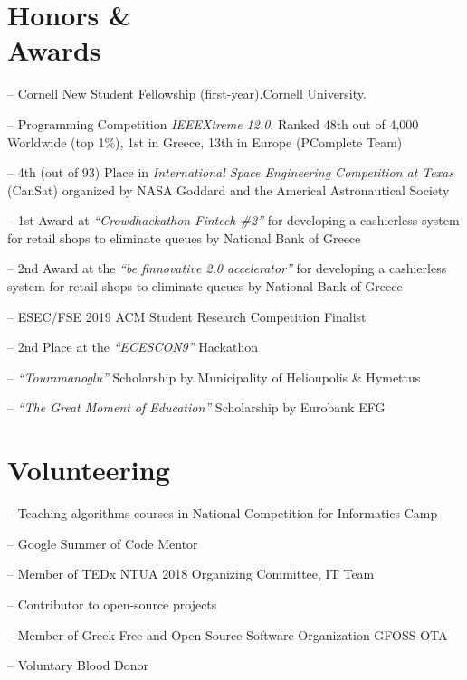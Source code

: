 \documentclass[margin, 10pt]{res}
\begin{document}
\begin{resume}
\section{Honors \& \\ Awards} 
\begin{compactitem}
	\item[--] Cornell New Student Fellowship (first-year).Cornell University. 
    \item[--] Programming Competition \emph{IEEEXtreme 12.0}. Ranked 48th out of 4,000 Worldwide (top 1\%), 1st in Greece, 13th in Europe (PComplete Team)
    \item[--] 4th (out of 93) Place in \emph{International Space Engineering  Competition at Texas} (CanSat) organized by NASA Goddard and the Americal Astronautical Society
    \item[--] 1st Award at \emph{``Crowdhackathon Fintech \#2''} for developing a cashierless system for retail shops to eliminate queues by National Bank of Greece
    \item[--] 2nd Award at the \emph{``be finnovative 2.0 accelerator''} for developing a cashierless system for retail shops to eliminate queues by National Bank of Greece
    \item[--] ESEC/FSE 2019 ACM Student Research Competition Finalist
    \item[--] 2nd Place at the \emph{``ECESCON9''} Hackathon 
    \item [--] \emph{``Touramanoglu''} Scholarship by Municipality of Helioupolis \& Hymettus
    \item [--] \emph{``The Great Moment of Education''} Scholarship by Eurobank EFG 

\end{compactitem}


\section{Volunteering} 
\begin{compactitem}
    \item[--] Teaching algorithms courses in National Competition for Informatics Camp 
    \item[--] Google Summer of Code Mentor
    \item[--] Member of TEDx NTUA 2018 Organizing Committee, IT Team 
    \item[--] Contributor to open-source projects
    \item[--] Member of Greek Free and Open-Source Software Organization GFOSS-OTA
    \item[--] Voluntary Blood Donor


\end{compactitem}
\end{resume}
\end{document}
